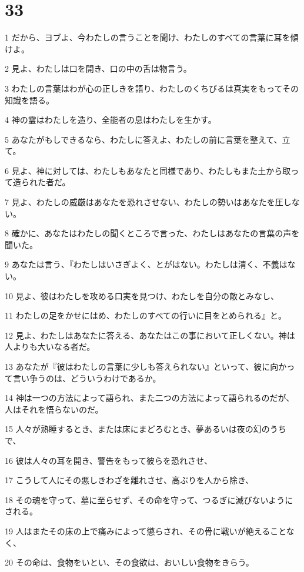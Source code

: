 \chapter{33}

\par 1 だから、ヨブよ、今わたしの言うことを聞け、わたしのすべての言葉に耳を傾けよ。
\par 2 見よ、わたしは口を開き、口の中の舌は物言う。
\par 3 わたしの言葉はわが心の正しきを語り、わたしのくちびるは真実をもってその知識を語る。
\par 4 神の霊はわたしを造り、全能者の息はわたしを生かす。
\par 5 あなたがもしできるなら、わたしに答えよ、わたしの前に言葉を整えて、立て。
\par 6 見よ、神に対しては、わたしもあなたと同様であり、わたしもまた土から取って造られた者だ。
\par 7 見よ、わたしの威厳はあなたを恐れさせない、わたしの勢いはあなたを圧しない。
\par 8 確かに、あなたはわたしの聞くところで言った、わたしはあなたの言葉の声を聞いた。
\par 9 あなたは言う、『わたしはいさぎよく、とがはない。わたしは清く、不義はない。
\par 10 見よ、彼はわたしを攻める口実を見つけ、わたしを自分の敵とみなし、
\par 11 わたしの足をかせにはめ、わたしのすべての行いに目をとめられる』と。
\par 12 見よ、わたしはあなたに答える、あなたはこの事において正しくない。神は人よりも大いなる者だ。
\par 13 あなたが『彼はわたしの言葉に少しも答えられない』といって、彼に向かって言い争うのは、どういうわけであるか。
\par 14 神は一つの方法によって語られ、また二つの方法によって語られるのだが、人はそれを悟らないのだ。
\par 15 人々が熟睡するとき、または床にまどろむとき、夢あるいは夜の幻のうちで、
\par 16 彼は人々の耳を開き、警告をもって彼らを恐れさせ、
\par 17 こうして人にその悪しきわざを離れさせ、高ぶりを人から除き、
\par 18 その魂を守って、墓に至らせず、その命を守って、つるぎに滅びないようにされる。
\par 19 人はまたその床の上で痛みによって懲らされ、その骨に戦いが絶えることなく、
\par 20 その命は、食物をいとい、その食欲は、おいしい食物をきらう。
